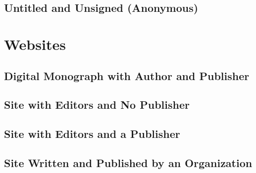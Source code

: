 \documentclass{article}
\begin{document}
\subsection{Untitled and Unsigned (Anonymous)} %
\label{sub:untitled_and_unsigned_anonymous}
\begin{refsection}
	\nocite{YouWill:aa}
	\printbibliography[heading=none]
\end{refsection}

\section{Websites} %
\label{sec:websites}
\subsection{Digital Monograph with Author and Publisher} %
\label{sub:digital_monograph_with_author_and_publisher}
\begin{refsection}
	\nocite{Bauch:tb}
	\printbibliography[heading=none]
\end{refsection}
\subsection{Site with Editors and No Publisher} %
\label{sub:site_with_editors_and_no_publisher}
\begin{refsection}
	\nocite{BlakeArchive:uh,VisualizingEmancipation:uf}
	\printbibliography[heading=none]
\end{refsection}
\subsection{Site with Editors and a Publisher} %
\label{sub:site_with_editors_and_a_publisher}
\begin{refsection}
	\nocite{PiersPEA:aa}
	\printbibliography[heading=none]
\end{refsection}
\subsection{Site Written and Published by an Organization} %
\label{sub:site_written_and_published_by_an_organization}
\begin{refsection}
	\nocite{Folgerpedia:aa}
	\printbibliography[heading=none]
\end{refsection}
\end{document}
